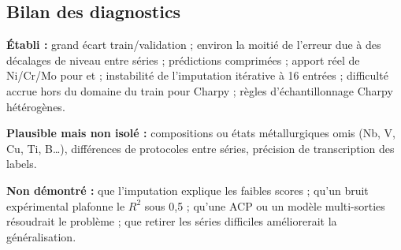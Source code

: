 \subsection{Bilan des diagnostics}

\begin{aretenir}
\textbf{Établi :} grand écart train/validation ; environ la moitié de l'erreur
due à des décalages de niveau entre séries ; prédictions comprimées ; apport
réel de Ni/Cr/Mo pour \YS{} et \UTS ; instabilité de l'imputation itérative à
16 entrées ; difficulté accrue hors du domaine du train pour Charpy ; règles
d'échantillonnage Charpy hétérogènes.

\textbf{Plausible mais non isolé :} compositions ou états métallurgiques omis
(Nb, V, Cu, Ti, B\ldots), différences de protocoles entre séries, précision de
transcription des labels.

\textbf{Non démontré :} que l'imputation explique les faibles scores ; qu'un
bruit expérimental plafonne le $R^2$ sous 0,5 ; qu'une ACP ou un modèle
multi-sorties résoudrait le problème ; que retirer les séries difficiles
améliorerait la généralisation.
\end{aretenir}
